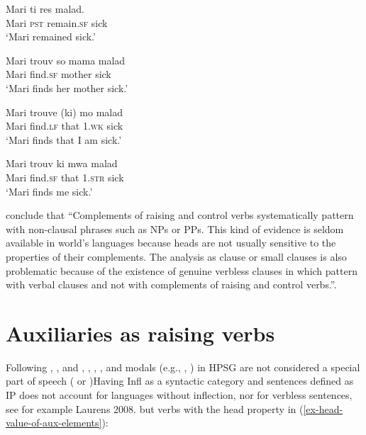 \eal
\ex 
\gll Mari ti res  malad.\\
     Mari \textsc{pst} remain.\textsc{sf} sick\\\hfill\citep[]{HenriandLaurens2011}
\glt `Mari remained sick.'

\ex 
\gll Mari trouv  so mama malad\\
     Mari find.\textsc{sf} \POSS{} mother sick\\
\glt `Mari finds her mother sick.'

\ex 
\gll Mari trouve (ki) mo malad\\
     Mari find.\textsc{lf} \hphantom{(}that 1\SG.\textsc{wk} sick\\
\glt `Mari finds that I am sick.'

\ex 
\gll Mari trouv            ki   mwa               malad\\
     Mari find.\textsc{sf} that 1\SG.\textsc{str} sick\\
\glt `Mari finds me sick.'
\zl

\citet[]{HenriandLaurens2011} conclude that ``Complements of raising and control verbs
systematically pattern with non-clausal phrases such as NPs or PPs. This kind of evidence is seldom
available in world's languages because heads are not usually sensitive to the properties of their
complements. The analysis as clause or small clauses is also problematic because of the existence of
genuine verbless clauses in  which pattern with verbal clauses and not with
complements of raising and control verbs.''.




\section{Auxiliaries as raising verbs}
\label{sec-auxiliaries-as-raising-verbs}

Following \citet{Ross69a-u}, \citet{Gazdaretal1982}, and \citet{Sagetal2020}, , , , and
modals (e.g., , ) in HPSG are not considered a special part of speech
( or ){Having Infl as a syntactic category and sentences defined as IP does not account for languages without inflection, nor for verbless sentences, see for example Laurens 2008.} but verbs with the head property in
(\ref{ex-head-value-of-aux-elements}):

